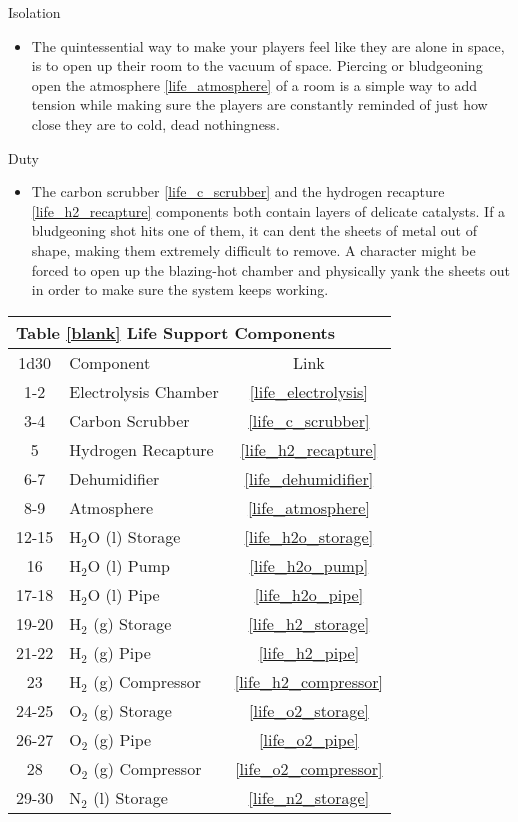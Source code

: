 \documentclass[a4paper]{article}
\begin{document}
\begin{minipage}[t]{0.4\linewidth}
Isolation
\begin{itemize}
\item The quintessential way to make your players feel like they are alone in space, is to open up their room to the vacuum of space. Piercing or bludgeoning open the atmosphere \ref{life_atmosphere} of a room is a simple way to add tension while making sure the players are constantly reminded of just how close they are to cold, dead nothingness.
\end{itemize}
\end{minipage}
\begin{minipage}[t]{0.4\linewidth}
Duty
\begin{itemize}
\item The carbon scrubber \ref{life_c_scrubber} and the hydrogen recapture \ref{life_h2_recapture} components both contain layers of delicate catalysts. If a bludgeoning shot hits one of them, it can dent the sheets of metal out of shape, making them extremely difficult to remove. A character might be forced to open up the blazing-hot chamber and physically yank the sheets out in order to make sure the system keeps working.
\end{itemize}
\end{minipage}

\vspace{0.5cm} \hspace{0.25\linewidth}
\begin{tabular}{@{} | c | l | c | @{}}
\toprule
\multicolumn{3}{|l|}{Table \ref{blank} Life Support Components} \\
\toprule
1d30 & Component & Link \\
\midrule
1-2 & Electrolysis Chamber & \ref{life_electrolysis} \\
3-4 & Carbon Scrubber & \ref{life_c_scrubber} \\
5 & Hydrogen Recapture & \ref{life_h2_recapture} \\
6-7 & Dehumidifier & \ref{life_dehumidifier} \\
8-9 & Atmosphere & \ref{life_atmosphere} \\
\midrule
12-15 & H$_2$O (l) Storage & \ref{life_h2o_storage} \\
16 & H$_2$O (l) Pump & \ref{life_h2o_pump} \\
17-18 & H$_2$O (l) Pipe & \ref{life_h2o_pipe} \\
19-20 & H$_2$ (g) Storage & \ref{life_h2_storage} \\
21-22 & H$_2$ (g) Pipe & \ref{life_h2_pipe} \\
23 & H$_2$ (g) Compressor & \ref{life_h2_compressor} \\
24-25 & O$_2$ (g) Storage & \ref{life_o2_storage} \\
26-27 & O$_2$ (g) Pipe & \ref{life_o2_pipe} \\
28 & O$_2$ (g) Compressor & \ref{life_o2_compressor} \\
29-30 & N$_2$ (l) Storage & \ref{life_n2_storage} \\
\bottomrule
\end{tabular}
\end{document}

